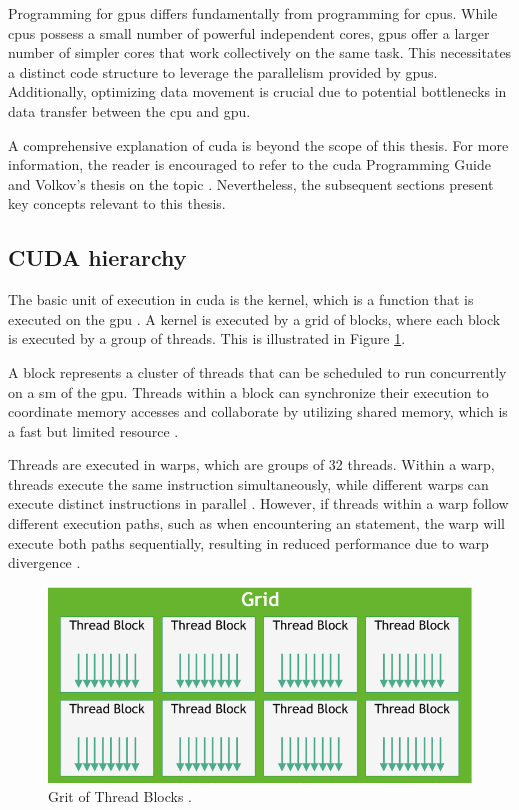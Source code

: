 Programming for \glspl{gpu} differs fundamentally from programming for \glspl{cpu}.
While \glspl{cpu} possess a small number of powerful independent cores, \glspl{gpu} offer a larger number of simpler cores that work collectively on the same task.
This necessitates a distinct code structure to leverage the parallelism provided by \glspl{gpu}.
Additionally, optimizing data movement is crucial due to potential bottlenecks in data transfer between the \gls{cpu} and \gls{gpu}.

A comprehensive explanation of \gls{cuda} is beyond the scope of this thesis.
For more information, the reader is encouraged to refer to the \gls{cuda} Programming Guide \cite{nvidiaCUDAProgrammingGuide} and Volkov's thesis on the topic \cite{volkovLatencyHiding2016}.
Nevertheless, the subsequent sections present key concepts relevant to this thesis.

\subsection{CUDA hierarchy}
The basic unit of execution in \gls{cuda} is the kernel, which is a function that is executed on the \gls{gpu} \cite[11]{nvidiaCUDAProgrammingGuide}.
A kernel is executed by a grid of blocks, where each block is executed by a group of threads.
This is illustrated in Figure \ref{fig:cuda_hierarchy}.

A block represents a cluster of threads that can be scheduled to run concurrently on a \gls{sm} of the \gls{gpu}.
Threads within a block can synchronize their execution to coordinate memory accesses and collaborate by utilizing shared memory, which is a fast but limited resource \cite[13,19]{nvidiaCUDAProgrammingGuide}.

Threads are executed in warps, which are groups of 32 threads.
Within a warp, threads execute the same instruction simultaneously, while different warps can execute distinct instructions in parallel \cite[10-12]{volkovLatencyHiding2016}.
However, if threads within a warp follow different execution paths, such as when encountering an  statement, the warp will execute both paths sequentially, resulting in reduced performance due to warp divergence \cite[10-12]{volkovLatencyHiding2016}.

\begin{figure}[H]
    \centering
    \includegraphics[width=.6\textwidth]{figures/concurrency/cuda_hierarchy.pdf}
    \caption{Grit of Thread Blocks \cite[15]{nvidiaCUDAProgrammingGuide}.}
    \label{fig:cuda_hierarchy}
\end{figure}

